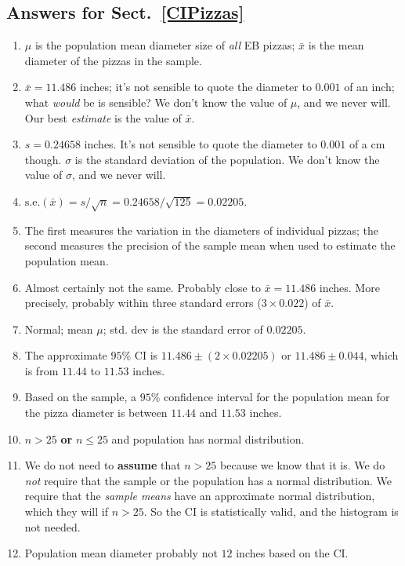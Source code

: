 \documentclass[
  11pt,
  a4paper,
  krantz2]{krantz}
\providecommand{\tightlist}{%
  \setlength{\itemsep}{0pt}\setlength{\parskip}{0pt}}
\begin{document}
\begin{footnotesize}
\subsection*{Answers for Sect.~\ref{CIPizzas}}\label{answers-for-sect.-refcipizzas}

\begin{enumerate}
\def\labelenumi{\arabic{enumi}.}
\tightlist
\item
  \(\mu\) is the population mean diameter size of \emph{all} EB pizzas;
  \(\bar{x}\) is the mean diameter of the pizzas in the sample.
\item
  \(\bar{x} = 11.486\) inches; it's not sensible to quote the diameter to \(0.001\) of an inch; what \emph{would} be is sensible?
  We don't know the value of \(\mu\), and we never will.
  Our best \emph{estimate} is the value of \(\bar{x}\).
\item
  \(s = 0.24658\) inches.
  It's not sensible to quote the diameter to \(0.001\) of a cm though.
  \(\sigma\) is the standard deviation of the population.
  We don't know the value of \(\sigma\), and we never will.
\item
  \(\displaystyle\text{s.e.}(\bar{x}) = s/\sqrt{n} = 0.24658/\sqrt{125} = 0.02205\).
\item
  The first measures the variation in the diameters of individual pizzas; the second measures the precision of the sample mean when used to estimate the population mean.
\item
  Almost certainly not the same.
  Probably close to \(\bar{x} = 11.486\) inches.
  More precisely, probably within three standard errors (\(3\times 0.022\)) of \(\bar{x}\).
\item
  Normal; mean \(\mu\); std. dev is the standard error of \(0.02205\).
\item
  The approximate \(95\)\% CI is \(11.486\pm (2\times 0.02205)\) or \(11.486\pm0.044\), which is from \(11.44\) to \(11.53\) inches.
\item
  Based on the sample, a \(95\)\% confidence interval for the population mean for the pizza diameter is between \(11.44\) and \(11.53\) inches.
\item
  \(n > 25\) \textbf{or} \(n\le 25\) and population has normal distribution.
\item
  We do not need to \textbf{assume} that \(n > 25\) because we know that it is.
  We do \emph{not} require that the sample or the population has a normal distribution.
  We require that the \emph{sample means} have an approximate normal distribution, which they will if \(n > 25\).
  So the CI is statistically valid, and the histogram is not needed.
\item
  Population mean diameter probably not \(12\) inches based on the CI.
\end{enumerate}


\end{footnotesize}
\end{document}
